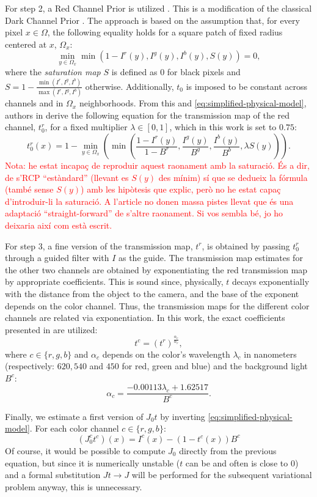 \documentclass[twocolumn,twoside,a4paper,10pt]{IEEEtran}
\newcommand{\Frank}[1]{\textcolor{red}{#1}}
\begin{document}
For step 2, a Red Channel Prior is utilized \cite{GALDRAN2015132}. This is a
modification of the classical Dark Channel Prior \cite{5567108}. The
approach is based on the assumption that, for every pixel \(x\in\Omega\), the following equality holds for a square patch of fixed radius centered at \(x\), \(\Omega_x\):
\[
  \min_{y\in\Omega_x}\min(1-I^r(y), I^g(y), I^b(y), S(y)) = 0
,\]
where the \textit{saturation map} \(S\) is defined as \(0\) for black pixels and \(S=1-\frac{\min(I^r, I^g, I^b)}{\max(I^r, I^g, I^b)}\) otherwise.
Additionally, \(t_0\) is imposed to be constant across channels and in \(\Omega_x\) neighborhoods. From this and \cref{eq:simplified-physical-model}, authors in \cite{GALDRAN2015132} derive the following equation for the transmission map of the red channel, \(t_0^r\), for a fixed multiplier \(\lambda\in[0,1]\), which in this work is set to \(0.75\):
\[
  t_0^r(x) = 1 - \min_{y\in\Omega_x}\left(\min\left(\frac{1-I^r(y)}{1-B^r}, \frac{I^g(y)}{B^g}, \frac{I^b(y)}{B^b}, \lambda S(y)\right)\right)
.\]
\Frank{Nota: he estat incapaç de reproduir aquest raonament amb la saturació. És a dir, de s'RCP ``estàndard'' (llevant es \(S(y)\) des mínim) sí que se dedueix la fórmula (també sense \(S(y)\)) amb les hipòtesis que explic, però no he estat capaç d'introduir-li la saturació. A l'article no donen massa pistes llevat que és una adaptació ``straight-forward'' de s'altre raonament. Si vos sembla bé, jo ho deixaria així com està escrit.}

For step 3, a fine version of the transmission map, \(t^r\), is obtained by passing \(t_0^r\) through a guided filter \cite{6319316} with \(I\) as the guide. The transmission map estimates for the other two channels are obtained by
exponentiating the red transmission map by appropriate coefficients. This is sound since, physically, \(t\) decays exponentially with the distance from the object to the camera, and the base of the exponent depends on the color channel. Thus, the transmission maps for the different color channels are related via exponentiation. In this work, the exact coefficients presented in \cite{7574330} are utilized:
\[
  t^c = (t^r)^\frac{\alpha_c}{\alpha_r}
,\]
where \(c\in\{r,g,b\}\) and \(\alpha_c\) depends on the color's wavelength \(\lambda_c\) in nanometers (respectively: \(620, 540\) and \(450\) for red, green and blue) and the background light \(B^c\):
\[
  \alpha_c = \frac{-0.00113\lambda_c + 1.62517}{B^c}
.\]

Finally, we estimate a first version of \(J_0t\) by inverting \cref{eq:simplified-physical-model}. For each color channel \(c\in\{r, g, b\}\):
\begin{equation}\label{eq:J0}
  (J^c_0t^c)(x) = I^c(x) - (1-t^c(x))B^c
\end{equation}
Of course, it would be possible to compute \(J_0\) directly from the previous equation, but since it is numerically unstable (\(t\) can be and often is close to \(0\)) and a formal substitution \(Jt\to J\) will be performed for the subsequent variational problem anyway, this is unnecessary.
\end{document}
